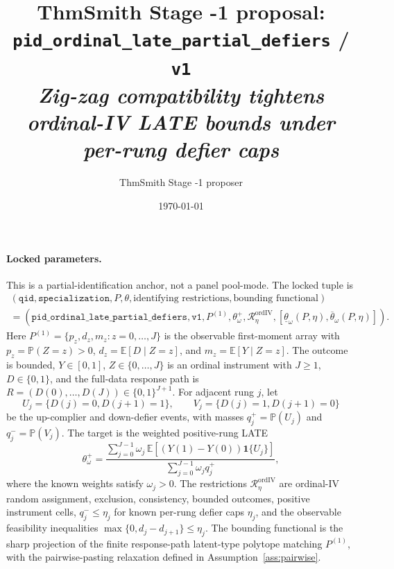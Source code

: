 \documentclass[11pt]{article}
\title{ThmSmith Stage -1 proposal: \texttt{pid\_ordinal\_late\_partial\_defiers} / \texttt{v1}%
  \\ \large\textit{Zig-zag compatibility tightens ordinal-IV LATE bounds under per-rung defier caps}}
\author{ThmSmith Stage -1 proposer}
\date{\today}
\newcommand{\E}{\mathbb{E}}
\renewcommand{\Pr}{\mathbb{P}}
\newcommand{\one}{\mathbf{1}}
\theoremstyle{definition}
\theoremstyle{plain}
\theoremstyle{remark}
\begin{document}
\maketitle


\paragraph{Locked parameters.}
This is a partial-identification anchor, not a panel pool-mode.  The locked tuple is
\[
\begin{gathered}
(\texttt{qid},\texttt{specialization},P,\theta,\text{identifying restrictions},
  \text{bounding functional})\\
=
(\texttt{pid\_ordinal\_late\_partial\_defiers},\texttt{v1},
  P^{(1)},\theta^+_\omega,\mathcal R_{\eta}^{\mathrm{ordIV}},
  [\underline\theta_\omega(P,\eta),\overline\theta_\omega(P,\eta)]) .
\end{gathered}
\]
Here \(P^{(1)}=\{p_z,d_z,m_z:z=0,\ldots,J\}\) is the observable first-moment array with \(p_z=\Pr(Z=z)>0\), \(d_z=\E[D\mid Z=z]\), and \(m_z=\E[Y\mid Z=z]\).  The outcome is bounded, \(Y\in[0,1]\), \(Z\in\{0,\ldots,J\}\) is an ordinal instrument with \(J\ge 1\), \(D\in\{0,1\}\), and the full-data response path is \(R=(D(0),\ldots,D(J))\in\{0,1\}^{J+1}\).  For adjacent rung \(j\), let
\[
U_j=\{D(j)=0,D(j+1)=1\},\qquad V_j=\{D(j)=1,D(j+1)=0\}
\]
be the up-complier and down-defier events, with masses \(q^+_j=\Pr(U_j)\) and \(q^-_j=\Pr(V_j)\).  The target is the weighted positive-rung LATE
\[
\theta^+_\omega
=\frac{\sum_{j=0}^{J-1}\omega_j\,\E[(Y(1)-Y(0))\one\{U_j\}]}
        {\sum_{j=0}^{J-1}\omega_j q^+_j},
\]
where the known weights satisfy \(\omega_j>0\).  The restrictions \(\mathcal R_{\eta}^{\mathrm{ordIV}}\) are ordinal-IV random assignment, exclusion, consistency, bounded outcomes, positive instrument cells, \(q^-_j\le \eta_j\) for known per-rung defier caps \(\eta_j\), and the observable feasibility inequalities \(\max\{0,d_j-d_{j+1}\}\le\eta_j\).  The bounding functional is the sharp projection of the finite response-path latent-type polytope matching \(P^{(1)}\), with the pairwise-pasting relaxation defined in Assumption~\ref{ass:pairwise}.
\end{document}

